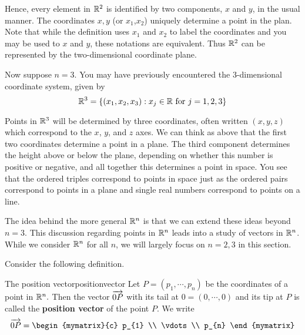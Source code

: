 Hence, every element in $\mathbb{R}^2$ is identified by two
components, $x$ and $y$, in the usual manner. The coordinates $x, y$ (or $x_1$,$x_2$) uniquely determine a point in the plan. Note that while the definition uses $x_1$ and $x_2$ to label the coordinates and you may be used to $x$ and $y$, these notations are equivalent. Thus $\mathbb{R}^2$ can be represented by the two-dimensional coordinate plane.

Now suppose $n=3$. You may have previously encountered the $3$-dimensional
coordinate system, given by
\begin{equation*}
\mathbb{R}^{3}=
\{\left( x_{1}, x_{2}, x_{3}\right)
:x_{j}\in \mathbb{R}\mbox{ for }j=1,2,3 \}
\end{equation*}

Points in $\mathbb{R}^3$ will be determined by three
coordinates, often written $\left(x,y,z\right)$ which correspond to the $x$, $y$,
and $z$ axes.  We can think as above that the first two coordinates
determine a point in a plane. The third component determines the
height above or below the plane, depending on whether this number is
positive or negative, and all together this determines a point in
space. You
see that the ordered triples correspond to points in space just as the
ordered pairs correspond to points in a plane and single real numbers
correspond to points on a line.

The idea behind the more general $\mathbb{R}^n$ is that we can extend
these ideas beyond $n = 3.$ This discussion regarding points in $\mathbb{R}^n$ leads into a study of vectors in $\mathbb{R}^n$. While we consider $\mathbb{R}^n$ for all $n$,
we will largely  focus on $n=2,3$ in this section. 

Consider the following definition.

\begin{definition}{The position vector}{positionvector}
Let $P=\left( p_{1},\cdots ,p_{n}\right) $ be the coordinates of a
point in $\mathbb{R}^{n}.$ Then the vector $\overrightarrow{0P}$ with its tail at
$0=\left( 0,\cdots ,0\right) $ and its tip at 
$P$ is called the \textbf{position vector} of the point $P$. 
We write 
\begin{equation*}
\longvect{0P} = \begin{mymatrix}{c}
p_{1} \\
\vdots \\
p_{n}
\end{mymatrix}
\end{equation*}
\end{definition}

